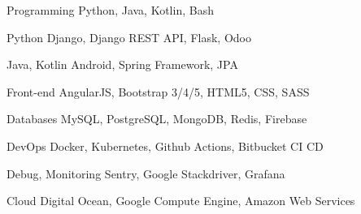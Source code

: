 

\begin{cvskills}

    \cvskill
    {Programming} %
    {Python, Java, Kotlin, Bash} %

    \cvskill
    {Python} %
    {Django, Django REST API, Flask, Odoo} %

    \cvskill
    {Java, Kotlin} %
    {Android, Spring Framework, JPA } %

    \cvskill
    {Front-end} %
    {AngularJS, Bootstrap 3/4/5, HTML5, CSS, SASS} %

    \cvskill
    {Databases} %
    {MySQL, PostgreSQL, MongoDB, Redis, Firebase} %

    \cvskill
    {DevOps} %
    {Docker, Kubernetes, Github Actions, Bitbucket CI CD} %

    \cvskill
    {Debug, Monitoring} %
    {Sentry, Google Stackdriver, Grafana} %

    \cvskill
    {Cloud } %
    {Digital Ocean, Google Compute Engine, Amazon Web Services } %

\end{cvskills}
